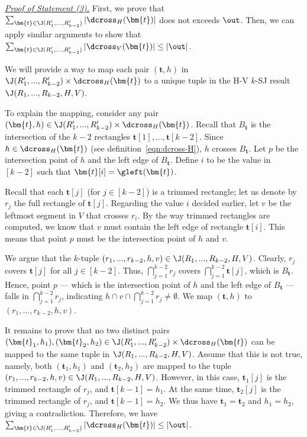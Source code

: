 



\vgap 


\noindent \underline{\em Proof of Statement (3).}  First, we prove that $\sum_{\bm{t}\in \J(R_1',...,R_{k-2}')}  |\dcross_H(\bm{t})|$ does not exceeds $\out$. Then, we can apply similar arguments to show that $\sum_{\bm{t}\in \J(R_1',...,R_{k-2}')}  |\dcross_V(\bm{t})| \leq |\out|$. 
 
\vgap 

We will provide a way to map each pair $(\bm{t},h)$ in $\J(R_1',...,R_{k-2}')\times \dcross_H(\bm{t})$ to a unique tuple in the H-V $k$-SJ result $\J(R_1,...,R_{k-2},H,V)$.

\vgap 

To explain the mapping, consider any pair $(\bm{t},h) \in \J(R_1',...,R_{k-2}')\times \dcross_H(\bm{t})$. Recall that $B_\bm{t}$ is the intersection of the $k-2$ rectangles $\bm{t}[1], ..., \bm{t}[k-2]$. Since $h \in \dcross_H(\bm{t})$ (see definition~\eqref{eqn:dcross-H}), $h$ crosses $B_\bm{t}$. Let $p$ be the intersection point of $h$ and the left edge of $B_\bm{t}$. Define $i$ to be the value in $[k-2]$ such that $\bm{t}[i] = \gleft(\bm{t})$. 

\vgap

Recall that each $\bm{t}[j]$ (for $j \in [k-2]$) is a trimmed rectangle; let us denote by $r_j$ the full rectangle of $\bm{t}[j]$. Regarding the value $i$ decided earlier, let $v$ be the leftmost segment in $V$ that crosses $r_i$. By the way trimmed rectangles are computed, we know that $v$ must contain the left edge of rectangle $\bm{t}[i]$. This means that point $p$ must be the intersection point of $h$ and $v$.

\vgap 

We argue that the $k$-tuple $(r_1, ..., r_{k-2}, h, v)\in \J(R_1,..., R_{k-2},H,V)$. Clearly, $r_j$ covers $\bm{t}[j]$ for all $j \in [k-2]$. Thus, $\bigcap_{j=1}^{k-2} r_j$ covers $\bigcap_{j=1}^{k-2} \bm{t}[j]$, which is $B_\bm{t}$. Hence, point $p$ --- which is the intersection point of $h$ and the left edge of $B_\bm{t}$ --- falls in $\bigcap_{j=1}^{k-2} r_j$, indicating $h \cap v \cap \bigcap_{j=1}^{k-2} r_j \ne \emptyset$. We map $(\bm{t},h)$ to $(r_1, ..., r_{k-2}, h, v)$.

\vgap

It remains to prove that no two distinct pairs $(\bm{t}_1, h_1), (\bm{t}_2, h_2) \in \J(R_1',...,R_{k-2}')\times \dcross_H(\bm{t})$ can be mapped to the same tuple in $\J(R_1,..., R_{k-2},H,V)$. Assume that this is not true, namely, both $(\bm{t}_1, h_1)$ and $(\bm{t}_2, h_2)$ are mapped to the tuple $(r_1, ..., r_{k-2}, h, v) \in \J(R_1,..., R_{k-2}, H, V)$. However, in this case, $\bm{t}_1[j]$ is the trimmed rectangle of $r_j$, and $\bm{t}[k-1] = h_1$. At the same time, $\bm{t}_2[j]$ is the trimmed rectangle of $r_j$, and $\bm{t}[k-1] = h_2$. We thus have $\bm{t}_1 = \bm{t}_2$ and $h_1 = h_2$, giving a contradiction. Therefore, we have $\sum_{\bm{t}\in \J(R_1',...,R_{k-2}')}  |\dcross_H(\bm{t})| \leq |\out|$.


